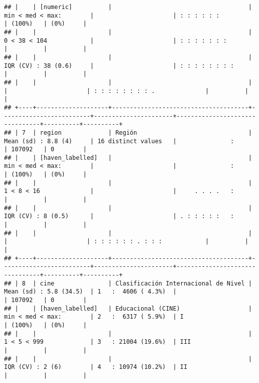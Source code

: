 \documentclass[]{article}
\begin{document}
\begin{verbatim}
## |    | [numeric]          |                                      | min < med < max:        |                      | : : : : : :                    | (100%)   | (0%)     |
## |    |                    |                                      | 0 < 38 < 104            |                      | : : : : : : :                  |          |          |
## |    |                    |                                      | IQR (CV) : 38 (0.6)     |                      | : : : : : : : :                |          |          |
## |    |                    |                                      |                         |                      | : : : : : : : : .              |          |          |
## +----+--------------------+--------------------------------------+-------------------------+----------------------+--------------------------------+----------+----------+
## | 7  | region             | Región                               | Mean (sd) : 8.8 (4)     | 16 distinct values   |               :                | 107092   | 0        |
## |    | [haven_labelled]   |                                      | min < med < max:        |                      |               :                | (100%)   | (0%)     |
## |    |                    |                                      | 1 < 8 < 16              |                      |     . . . .   :                |          |          |
## |    |                    |                                      | IQR (CV) : 8 (0.5)      |                      | . : : : : :   :                |          |          |
## |    |                    |                                      |                         |                      | : : : : : : . : : :            |          |          |
## +----+--------------------+--------------------------------------+-------------------------+----------------------+--------------------------------+----------+----------+
## | 8  | cine               | Clasificación Internacional de Nivel | Mean (sd) : 5.8 (34.5)  | 1   :  4606 ( 4.3%)  |                                | 107092   | 0        |
## |    | [haven_labelled]   | Educacional (CINE)                   | min < med < max:        | 2   :  6317 ( 5.9%)  | I                              | (100%)   | (0%)     |
## |    |                    |                                      | 1 < 5 < 999             | 3   : 21004 (19.6%)  | III                            |          |          |
## |    |                    |                                      | IQR (CV) : 2 (6)        | 4   : 10974 (10.2%)  | II                             |          |          |

\end{verbatim}
\end{document}
